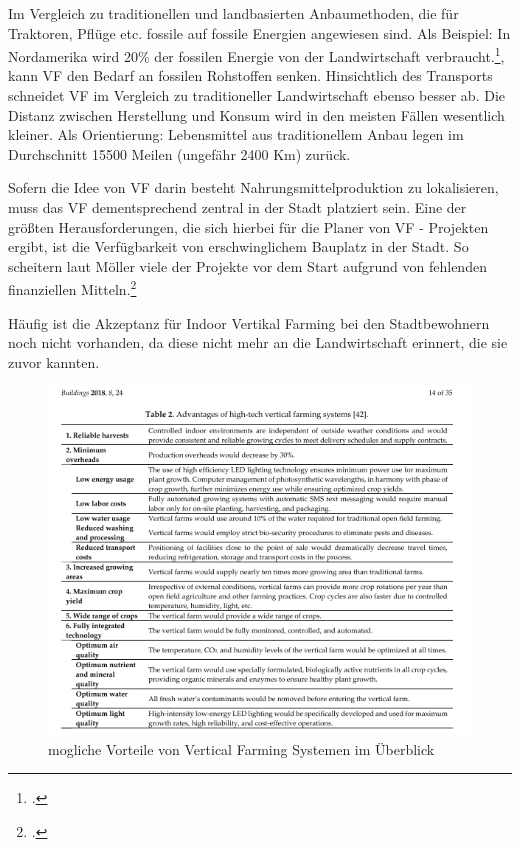 \documentclass{scrartcl}
\begin{document}
Im Vergleich zu traditionellen und landbasierten Anbaumethoden, die für Traktoren, Pflüge etc. fossile auf fossile Energien angewiesen sind. Als Beispiel: In Nordamerika wird 20\% der fossilen Energie von der Landwirtschaft verbraucht.\footcite[Vgl.][S.27]{Al-Kodmany2018TheCity[82,83}, kann VF den Bedarf an fossilen Rohstoffen senken.
Hinsichtlich des Transports schneidet VF im Vergleich zu traditioneller Landwirtschaft ebenso besser ab. Die Distanz zwischen Herstellung und Konsum wird in den meisten Fällen wesentlich kleiner. Als Orientierung: Lebensmittel aus traditionellem Anbau legen im Durchschnitt 15500 Meilen (ungefähr 2400 Km) zurück.



Sofern die Idee von VF darin besteht Nahrungsmittelproduktion zu lokalisieren, muss das VF dementsprechend zentral in der Stadt platziert sein. Eine der größten Herausforderungen, die sich hierbei für die Planer von VF - Projekten ergibt, ist die Verfügbarkeit von erschwinglichem Bauplatz in der Stadt. So scheitern laut Möller viele der Projekte vor dem Start aufgrund von fehlenden finanziellen Mitteln.\footcite[S.8]{PeterMollerVoss2013VerticalRise}

Häufig ist die Akzeptanz für Indoor Vertikal Farming bei den Stadtbewohnern noch nicht vorhanden, da diese nicht mehr an die Landwirtschaft erinnert, die sie zuvor kannten.


\begin{figure}[htbp]
\centering
\includegraphics[width=14cm]{image_folder/moglicheVorteileVonVF.png}
\caption{mogliche Vorteile von Vertical Farming Systemen im Überblick}
\label{fig:vorteileVF}
\end{figure}
\end{document}
